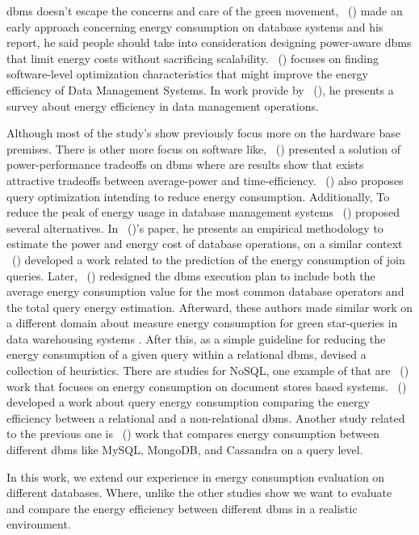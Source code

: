 \gls{dbms} doesn't escape the concerns and care of the green movement, \citeauthor{agrawal2008claremont}~(\citeyear{agrawal2008claremont}) made an early approach concerning energy consumption on database systems and his report, he said people should take into consideration designing power-aware \gls{dbms} that limit energy costs without sacrificing scalability.
\citeauthor{HarizopoulosEnergy}~(\citeyear{HarizopoulosEnergy}) focuses on finding software-level optimization characteristics that might improve the energy efficiency of Data Management Systems. 
In work provide by \citeauthor{wang2011survey}~(\citeyear{wang2011survey}), he presents a survey about energy efficiency in data management operations.

Although most of the study's show previously focus more on the hardware base premises. There is other more focus on software like,
\citeauthor{5447840}~(\citeyear{5447840}) presented a solution of power-performance tradeoffs on \gls{dbms} where are results show that exists attractive tradeoffs between average-power and time-efficiency. \citeauthor{xupet}~(\citeyear{xupet}) also proposes query optimization intending to reduce energy consumption. Additionally, To reduce the peak of energy usage in database management systems \citeauthor{KunjirPeakPower}~(\citeyear{KunjirPeakPower}) proposed several alternatives. In \citeauthor{RODRIGUEZMARTINEZ2011112}~(\citeyear{RODRIGUEZMARTINEZ2011112})'s paper, he presents an empirical methodology to estimate the power and energy cost of database operations, on a similar context \citeauthor{6738985}~(\citeyear{6738985})  developed a work related to the prediction of the energy consumption of join queries. Later, \citeauthor{gonçalvesbelo}~(\citeyear{gonçalvesbelo}) redesigned the \gls{dbms} execution plan to include both the average energy consumption value for the most common database operators and the total query energy estimation. Afterward, these authors made similar work on a different domain about measure energy consumption for green star-queries in data warehousing systems \cite{7396507}. After this, as a simple guideline for reducing the energy consumption of a given query within a relational \gls{dbms},  \cite{guimaraes2016some} devised a collection of heuristics. There are studies for NoSQL, one example of that are \citeauthor{duarte2017evaluating}~(\citeyear{duarte2017evaluating}) work that focuses on energy consumption on document stores based systems. \citeauthor{Authenticus:P-00P-QKR}~(\citeyear{Authenticus:P-00P-QKR}) developed a work about query energy consumption comparing the energy efficiency between a relational and a non-relational \gls{dbms}. Another study related to the previous one is \citeauthor{mahajan2016energy}~(\citeyear{mahajan2016energy}) work that compares energy consumption between different \gls{dbms} like MySQL, MongoDB, and Cassandra on a query level.



In this work, we extend our experience in energy consumption evaluation on different databases. Where, unlike the other studies show we want to evaluate and compare the energy efficiency between different \gls{dbms} in a realistic environment.







